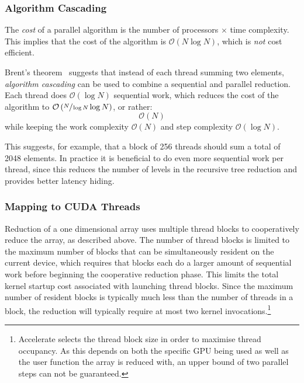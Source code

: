 \subsubsection{Algorithm Cascading}
\label{sec:algorithm_cascading}

The \emph{cost} of a parallel algorithm is the number of processors $\times$
time complexity. This implies that the cost of the algorithm is
$\mathcal{O}\left( N \log N \right)$, which is \emph{not} cost efficient.

Brent's theorem~\cite{Chatterjee:2009vh} suggests that instead of each thread
summing two elements, \emph{algorithm cascading} can be used to combine a
sequential and parallel reduction. Each thread does $\mathcal{O}\left( \log N
\right)$ sequential work, which reduces the cost of the algorithm to
$\mathcal{O}\left( \sfrac{N}{\log N} \log N \right)$, or rather:
\[
\mathcal{O}\left( N \right)
\]
while keeping the work complexity $\mathcal{O}\left( N \right)$ and step
complexity $\mathcal{O}\left( \log N \right)$.

This suggests, for example, that a block of 256 threads should sum a total of
2048 elements. In practice it is beneficial to do even more sequential work per
thread, since this reduces the number of levels in the recursive tree reduction
and provides better latency hiding.


\subsubsection{Mapping to CUDA Threads}

Reduction of a one dimensional array uses multiple thread blocks to
cooperatively reduce the array, as described above. The number of thread blocks
is limited to the maximum number of blocks that can be simultaneously resident
on the current device, which requires that blocks each do a larger amount of
sequential work before beginning the cooperative reduction phase. This limits
the total kernel startup cost associated with launching thread blocks. Since the
maximum number of resident blocks is typically much less than the number of
threads in a block, the reduction will typically require at most two kernel
invocations.\footnote{Accelerate selects the thread block size in order to
maximise thread occupancy. As this depends on both the specific GPU being used
as well as the user function the array is reduced with, an upper bound of two
parallel steps can not be guaranteed.}

